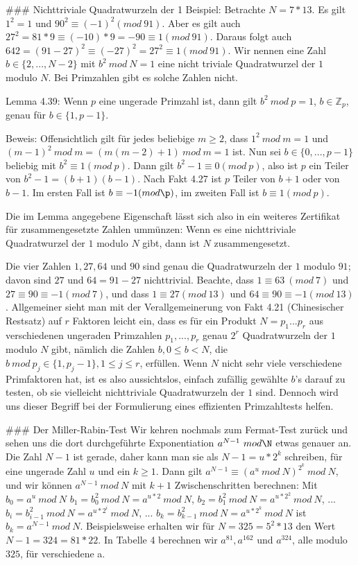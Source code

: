 \documentclass[a4paper]{article}
\begin{document}
\begin{multicols}{3}
        ### Nichttriviale Quadratwurzeln der 1
        Beispiel: Betrachte $N=7*13$. Es gilt $1^2 = 1$ und $90^2 \equiv(-1)^2 (mod\ 91)$. Aber es gilt auch $27^2 = 81* 9 \equiv(-10)*9 = -90\equiv 1(mod\ 91)$. Daraus folgt auch
    $642 =(91-27)^2 \equiv (-27)^2 = 27^2 \equiv 1 (mod\ 91)$. Wir nennen eine Zahl $b\in\{2,...,N-2\}$ mit $b^2\ mod\ N=1$ eine nicht triviale Quadratwurzel der $1$ modulo $N$. Bei Primzahlen gibt es solche Zahlen nicht.

        Lemma 4.39: Wenn $p$ eine ungerade Primzahl ist, dann gilt $b^2\ mod\ p = 1$, $b \in\mathbb{Z}_p$, genau für $b\in\{1 ,p-1\}$.

        Beweis: Offensichtlich gilt für jedes beliebige $m\geq 2$, dass $1^2\ mod\ m= 1$ und $(m-1)^2\ mod\ m= (m(m-2)+1)\ mod\ m= 1$ ist. Nun sei $b\in\{0 ,...,p-1\}$ beliebig mit $b^2\equiv 1(mod\ p)$. Dann gilt $b^2-1 \equiv 0 (mod\ p)$, also ist $p$ ein Teiler von $b^2-1 =(b+1)(b-1)$. Nach Fakt 4.27 ist $p$ Teiler von $b+1$ oder von $b-1$. Im ersten Fall ist $b\equiv -1 (mod\p)$, im zweiten Fall ist $b\equiv 1(mod\ p)$.

        Die im Lemma angegebene Eigenschaft lässt sich also in ein weiteres Zertifikat für zusammengesetzte Zahlen ummünzen:
        Wenn es eine nichttriviale Quadratwurzel der $1$ modulo $N$ gibt, dann ist $N$ zusammengesetzt.

        Die vier Zahlen $1, 27, 64$ und $90$ sind genau die Quadratwurzeln der $1$ modulo $91$; davon sind $27$ und $64 = 91-27$ nichttrivial. Beachte, dass $1\equiv 63\ (mod\ 7)$ und $27\equiv 90 \equiv -1(mod\ 7)$, und dass $1\equiv 27 (mod\ 13)$ und $64\equiv 90 \equiv -1 (mod\ 13)$. Allgemeiner sieht man mit der Verallgemeinerung von Fakt 4.21 (Chinesischer Restsatz) auf $r$ Faktoren leicht ein, dass es für ein Produkt $N=p_1...p_r$ aus verschiedenen ungeraden Primzahlen $p_1,...,p_r$ genau $2^r$ Quadratwurzeln der $1$ modulo $N$ gibt, nämlich die Zahlen $b,0\leq b < N$, die $b\ mod\ p_j\in\{1 ,p_j-1\}, 1\leq j\leq r$, erfüllen. Wenn $N$ nicht sehr viele verschiedene Primfaktoren hat, ist es also aussichtslos, einfach zufällig gewählte $b$’s darauf zu testen, ob sie vielleicht nichttriviale Quadratwurzeln der $1$ sind. Dennoch wird uns dieser Begriff bei der Formulierung eines effizienten Primzahltests helfen.

        ### Der Miller-Rabin-Test
        Wir kehren nochmals zum Fermat-Test zurück und sehen uns die dort durchgeführte Exponentiation $a^{N-1}\ mod\N$ etwas genauer an. Die Zahl $N-1$ ist gerade, daher kann man sie als $N-1=u*2^k$ schreiben, für eine ungerade Zahl $u$ und ein $k\geq 1$. Dann gilt $a^{N-1} \equiv (a^u\ mod\ N)^{2^k}\ mod\ N$, und wir können $a^{N-1}\ mod\ N$ mit $k+1$ Zwischenschritten berechnen: Mit
    $b_0 =a^u\ mod\ N$
    $b_1 =b^2_0\ mod\ N=a^{u*2}\ mod\ N$,
    $b_2 =b^2_1\ mod\ N=a^{u*2^2}\ mod\ N$,
        ...
    $b_i=b^2_{i-1}\ mod\ N=a^{u*2^i}\ mod\ N$,
        ...
    $b_k=b^2_{k-1}\ mod\ N=a^{u*2^k}\ mod\ N$
        ist $b_k=a^{N-1}\ mod\ N$. Beispielsweise erhalten wir für $N=325 = 5^2 *13$ den Wert $N-1 = 324 = 81* 22$. In Tabelle 4 berechnen wir $a^{81} ,a^{162}$ und $a^{324}$, alle modulo $325$, für verschiedene a.


\end{multicols}
\end{document}
